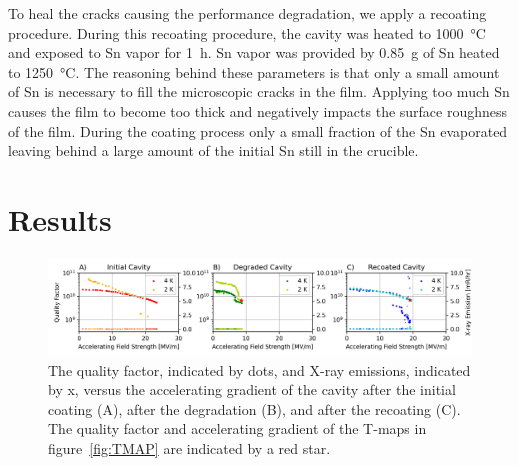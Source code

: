 \documentclass{revtex4-2}
\begin{document}
To heal the cracks causing the performance degradation, we apply a recoating procedure. During this recoating procedure, the cavity was heated to \qty{1000}{\degreeCelsius} and exposed to Sn vapor for \qty{1}{\hour}. Sn vapor was provided by \qty{0.85}{\gram} of Sn heated to \qty{1250}{\degreeCelsius}. The reasoning behind these parameters is that only a small amount of Sn is necessary to fill the microscopic cracks in the film. Applying too much Sn causes the film to become too thick and negatively impacts the surface roughness of the film. During the coating process only a small fraction of the Sn evaporated leaving behind a large amount of the initial Sn still in the crucible. 

\section{Results}
\label{sec:Results}

\begin{figure}[h]%
    \centering%
    \includegraphics[width=1.0\columnwidth]{./figures/VTS.png}%
    \caption{The quality factor, indicated by dots, and X-ray emissions, indicated by x, versus the accelerating gradient of the cavity after the initial coating (A), after the degradation (B), and after the recoating (C). The quality factor and accelerating gradient of the T-maps in figure~{\protect\ref{fig:TMAP}} are indicated by a red star.}%
    \label{fig:VTS}%
\end{figure}
\end{document}

